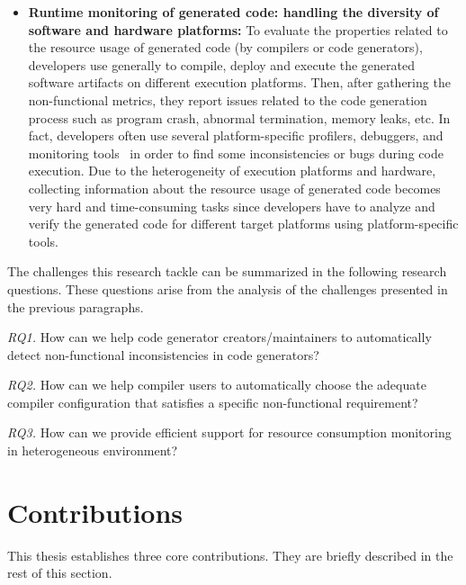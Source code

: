\begin{itemize}
\item
\textbf{Runtime monitoring of generated code: handling the diversity of software and hardware platforms:} To evaluate the properties related to the resource usage of generated code (by compilers or code generators), developers use generally to compile, deploy and execute the generated software artifacts on different execution platforms. Then, after gathering the non-functional metrics, they report issues related to the code generation process such as program crash, abnormal termination, memory leaks, etc.
In fact, developers often use several platform-specific profilers, debuggers, and monitoring tools~\cite{guana2014chaintracker,delgado2004taxonomy} in order to find some inconsistencies or bugs during code execution. 
Due to the heterogeneity of execution platforms and hardware, collecting information about the resource usage of generated code becomes very hard and time-consuming tasks since developers have to analyze and verify the generated code for different target platforms using platform-specific tools. 


\end{itemize}
The challenges this research tackle can be summarized in the following research questions. These questions arise from the analysis of the challenges presented in the previous paragraphs.

\textit{RQ1.} How can we help code generator creators/maintainers to automatically detect non-functional inconsistencies in code generators?

\textit{RQ2.} How can we help compiler users to automatically choose the adequate compiler configuration that satisfies a specific non-functional requirement?

\textit{RQ3.} How can we provide efficient support for resource consumption monitoring in heterogeneous environment?


\section{Contributions}
This thesis establishes three core contributions. They are briefly described in the rest of this section.

